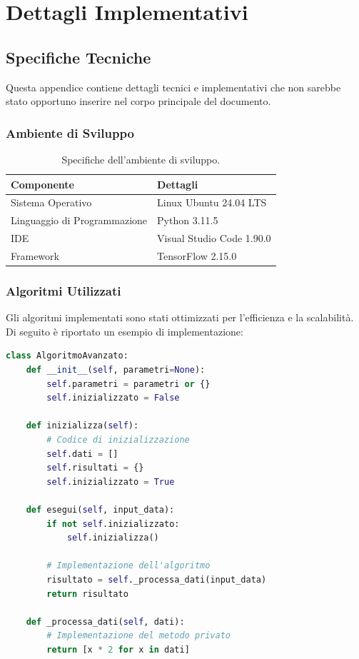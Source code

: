 \chapter{Dettagli Implementativi}

\section{Specifiche Tecniche}

Questa appendice contiene dettagli tecnici e implementativi che non sarebbe stato opportuno inserire nel corpo principale del documento.

\subsection{Ambiente di Sviluppo}

\begin{table}[htbp]
    \centering
    \caption{Specifiche dell'ambiente di sviluppo.}
    \label{tab:ambiente-sviluppo}
    \begin{tabular}{ll}
        \toprule
        \textbf{Componente} & \textbf{Dettagli} \\
        \midrule
        Sistema Operativo & Linux Ubuntu 24.04 LTS \\
        Linguaggio di Programmazione & Python 3.11.5 \\
        IDE & Visual Studio Code 1.90.0 \\
        Framework & TensorFlow 2.15.0 \\
        \bottomrule
    \end{tabular}
\end{table}

\subsection{Algoritmi Utilizzati}

Gli algoritmi implementati sono stati ottimizzati per l'efficienza e la scalabilità. Di seguito è riportato un esempio di implementazione:

\begin{lstlisting}[language=Python, caption=Implementazione dell'algoritmo principale]
class AlgoritmoAvanzato:
    def __init__(self, parametri=None):
        self.parametri = parametri or {}
        self.inizializzato = False
        
    def inizializza(self):
        # Codice di inizializzazione
        self.dati = []
        self.risultati = {}
        self.inizializzato = True
        
    def esegui(self, input_data):
        if not self.inizializzato:
            self.inizializza()
            
        # Implementazione dell'algoritmo
        risultato = self._processa_dati(input_data)
        return risultato
        
    def _processa_dati(self, dati):
        # Implementazione del metodo privato
        return [x * 2 for x in dati]
\end{lstlisting}


